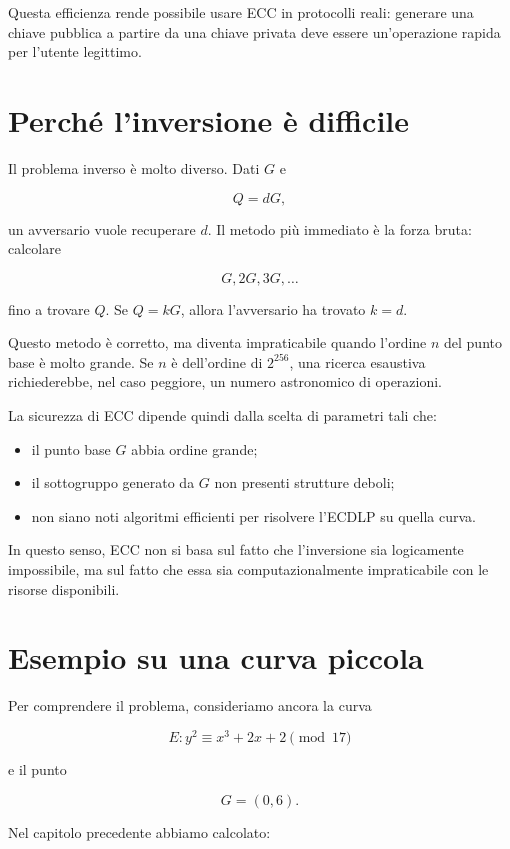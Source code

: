 \documentclass[12pt,a4paper,oneside]{report}
\begin{document}
Questa efficienza rende possibile usare ECC in protocolli reali: generare una chiave pubblica a partire da una chiave privata deve essere un'operazione rapida per l'utente legittimo.

\section{Perché l'inversione è difficile}

Il problema inverso è molto diverso. Dati \(G\) e

\[
Q=dG,
\]

un avversario vuole recuperare \(d\). Il metodo più immediato è la forza bruta: calcolare

\[
G, 2G, 3G, \ldots
\]

fino a trovare \(Q\). Se \(Q=kG\), allora l'avversario ha trovato \(k=d\).

Questo metodo è corretto, ma diventa impraticabile quando l'ordine \(n\) del punto base è molto grande. Se \(n\) è dell'ordine di \(2^{256}\), una ricerca esaustiva richiederebbe, nel caso peggiore, un numero astronomico di operazioni.

La sicurezza di ECC dipende quindi dalla scelta di parametri tali che:

\begin{itemize}
    \item il punto base \(G\) abbia ordine grande;
    \item il sottogruppo generato da \(G\) non presenti strutture deboli;
    \item non siano noti algoritmi efficienti per risolvere l'ECDLP su quella curva.
\end{itemize}

In questo senso, ECC non si basa sul fatto che l'inversione sia logicamente impossibile, ma sul fatto che essa sia computazionalmente impraticabile con le risorse disponibili.

\section{Esempio su una curva piccola}

Per comprendere il problema, consideriamo ancora la curva

\[
E: y^2 \equiv x^3 + 2x + 2 \pmod{17}
\]

e il punto

\[
G=(0,6).
\]

Nel capitolo precedente abbiamo calcolato:
\end{document}
